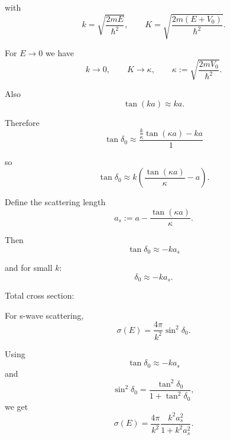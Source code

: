 \documentclass[11pt,a4paper]{scrartcl}
\begin{document}
\begin{enumerate}
\begin{enumerate}
\begin{calculationbox}
                        with
                        \[
                        k=\sqrt{\frac{2mE}{\hbar^2}},
                        \qquad
                        K=\sqrt{\frac{2m(E+V_0)}{\hbar^2}}.
                        \]

                        For $E \to 0$ we have
                        \[
                        k \to 0,
                        \qquad
                        K \to \kappa,
                        \qquad
                        \kappa := \sqrt{\frac{2mV_0}{\hbar^2}}.
                        \]

                        Also
                        \[
                        \tan(ka) \approx ka.
                        \]

                        Therefore
                        \[
                        \tan\delta_0
                        \approx
                        \frac{\frac{k}{\kappa}\tan(\kappa a)-ka}
                        {1}
                        \]

                        so
                        \[
                        \tan\delta_0
                        \approx
                        k\left(
                        \frac{\tan(\kappa a)}{\kappa}-a
                        \right).
                        \]

                        Define the scattering length
                        \[
                        a_s
                        :=
                        a-\frac{\tan(\kappa a)}{\kappa}.
                        \]

                        Then
                        \[
                        \boxed{
                        \tan\delta_0 \approx -ka_s
                        }
                        \]

                        and for small $k$:
                        \[
                        \boxed{
                        \delta_0 \approx -ka_s
                        }.
                        \]
                    \end{calculationbox}

                    Total cross section:
                    \begin{calculationbox}
                        For s-wave scattering,
                        \[
                        \sigma(E)
                        =
                        \frac{4\pi}{k^2}\sin^2\delta_0.
                        \]

                        Using
                        \[
                        \tan\delta_0 \approx -ka_s
                        \]
                        and
                        \[
                        \sin^2\delta_0
                        =
                        \frac{\tan^2\delta_0}{1+\tan^2\delta_0},
                        \]
                        we get
                        \[
                        \sigma(E)
                        =
                        \frac{4\pi}{k^2}
                        \frac{k^2a_s^2}{1+k^2a_s^2}.
                        \]


\end{calculationbox}
\end{enumerate}
\end{enumerate}
\end{document}
